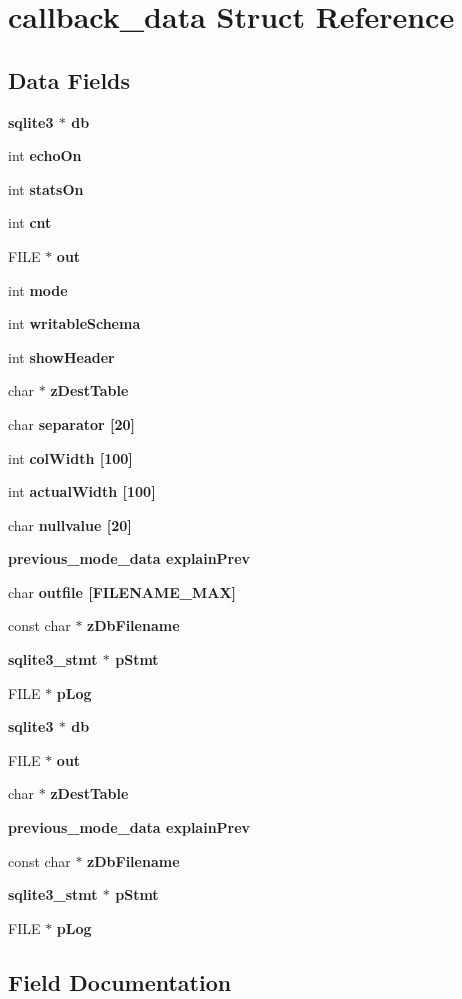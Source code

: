\section{callback\_\-data Struct Reference}
\label{structcallback__data}
\subsection*{Data Fields}
\begin{CompactItemize}
\item 
\bf{sqlite3} $\ast$ \bf{db}
\item 
int \bf{echo\-On}
\item 
int \bf{stats\-On}
\item 
int \bf{cnt}
\item 
FILE $\ast$ \bf{out}
\item 
int \bf{mode}
\item 
int \bf{writable\-Schema}
\item 
int \bf{show\-Header}
\item 
char $\ast$ \bf{z\-Dest\-Table}
\item 
char \bf{separator} [20]
\item 
int \bf{col\-Width} [100]
\item 
int \bf{actual\-Width} [100]
\item 
char \bf{nullvalue} [20]
\item 
\bf{previous\_\-mode\_\-data} \bf{explain\-Prev}
\item 
char \bf{outfile} [FILENAME\_\-MAX]
\item 
const char $\ast$ \bf{z\-Db\-Filename}
\item 
\bf{sqlite3\_\-stmt} $\ast$ \bf{p\-Stmt}
\item 
FILE $\ast$ \bf{p\-Log}
\item 
\bf{sqlite3} $\ast$ \bf{db}
\item 
FILE $\ast$ \bf{out}
\item 
char $\ast$ \bf{z\-Dest\-Table}
\item 
\bf{previous\_\-mode\_\-data} \bf{explain\-Prev}
\item 
const char $\ast$ \bf{z\-Db\-Filename}
\item 
\bf{sqlite3\_\-stmt} $\ast$ \bf{p\-Stmt}
\item 
FILE $\ast$ \bf{p\-Log}
\end{CompactItemize}


\subsection{Field Documentation}
